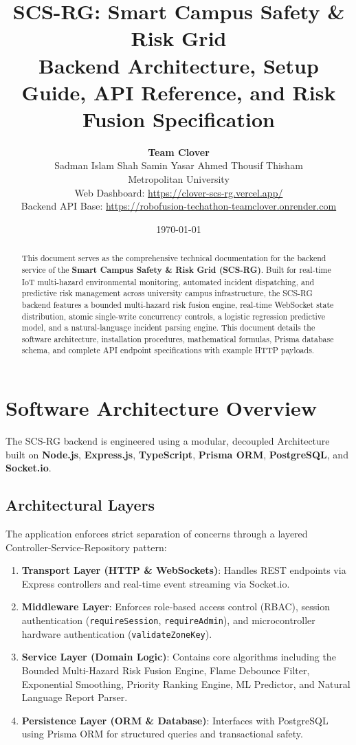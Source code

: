 \documentclass[11pt,a4paper]{article}
\title{\textbf{\Large SCS-RG: Smart Campus Safety \& Risk Grid}\\
\vspace{0.2cm}
\Large Backend Architecture, Setup Guide, API Reference, and Risk Fusion Specification}
\author{\textbf{Team Clover}\\
Sadman Islam \quad Shah Samin Yasar \quad Ahmed Thousif Thisham\\
Metropolitan University\\
\small Web Dashboard: \href{https://clover-scs-rg.vercel.app/}{https://clover-scs-rg.vercel.app/}\\
\small Backend API Base: \href{https://robofusion-techathon-teamclover.onrender.com}{https://robofusion-techathon-teamclover.onrender.com}}
\date{\today}
\begin{document}
\maketitle

\begin{abstract}
This document serves as the comprehensive technical documentation for the backend service of the \textbf{Smart Campus Safety \& Risk Grid (SCS-RG)}. Built for real-time IoT multi-hazard environmental monitoring, automated incident dispatching, and predictive risk management across university campus infrastructure, the SCS-RG backend features a bounded multi-hazard risk fusion engine, real-time WebSocket state distribution, atomic single-write concurrency controls, a logistic regression predictive model, and a natural-language incident parsing engine. This document details the software architecture, installation procedures, mathematical formulas, Prisma database schema, and complete API endpoint specifications with example HTTP payloads.
\end{abstract}

\tableofcontents
\newpage

\section{Software Architecture Overview}

The SCS-RG backend is engineered using a modular, decoupled Architecture built on \textbf{Node.js}, \textbf{Express.js}, \textbf{TypeScript}, \textbf{Prisma ORM}, \textbf{PostgreSQL}, and \textbf{Socket.io}.

\subsection{Architectural Layers}
The application enforces strict separation of concerns through a layered Controller-Service-Repository pattern:
\begin{enumerate}[leftmargin=*]
    \item \textbf{Transport Layer (HTTP \& WebSockets)}: Handles REST endpoints via Express controllers and real-time event streaming via Socket.io.
    \item \textbf{Middleware Layer}: Enforces role-based access control (RBAC), session authentication (\texttt{requireSession}, \texttt{requireAdmin}), and microcontroller hardware authentication (\texttt{validateZoneKey}).
    \item \textbf{Service Layer (Domain Logic)}: Contains core algorithms including the Bounded Multi-Hazard Risk Fusion Engine, Flame Debounce Filter, Exponential Smoothing, Priority Ranking Engine, ML Predictor, and Natural Language Report Parser.
    \item \textbf{Persistence Layer (ORM \& Database)}: Interfaces with PostgreSQL using Prisma ORM for structured queries and transactional safety.
\end{enumerate}
\end{document}
